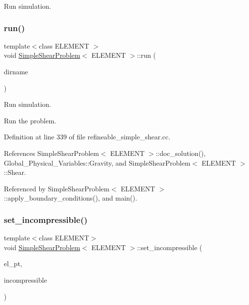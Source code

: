 Run simulation. 

\mbox{\label{classSimpleShearProblem_ac1746a2634e310571d40d70719d509c0}} 
\subsubsection{\texorpdfstring{run()}{run()}\hspace{0.1cm}{\footnotesize\ttfamily [2/2]}}
{\footnotesize\ttfamily template$<$class E\+L\+E\+M\+E\+NT $>$ \\
void \hyperlink{classSimpleShearProblem}{Simple\+Shear\+Problem}$<$ E\+L\+E\+M\+E\+NT $>$\+::run (\begin{DoxyParamCaption}\item[{const std\+::string \&}]{dirname }\end{DoxyParamCaption})}



Run simulation. 

Run the problem. 

Definition at line 339 of file refineable\+\_\+simple\+\_\+shear.\+cc.



References Simple\+Shear\+Problem$<$ E\+L\+E\+M\+E\+N\+T $>$\+::doc\+\_\+solution(), Global\+\_\+\+Physical\+\_\+\+Variables\+::\+Gravity, and Simple\+Shear\+Problem$<$ E\+L\+E\+M\+E\+N\+T $>$\+::\+Shear.



Referenced by Simple\+Shear\+Problem$<$ E\+L\+E\+M\+E\+N\+T $>$\+::apply\+\_\+boundary\+\_\+conditions(), and main().

\mbox{\label{classSimpleShearProblem_a3e5d5f57fc041531ee683f50395536f0}} 
\subsubsection{\texorpdfstring{set\+\_\+incompressible()}{set\_incompressible()}\hspace{0.1cm}{\footnotesize\ttfamily [1/7]}}
{\footnotesize\ttfamily template$<$class E\+L\+E\+M\+E\+NT$>$ \\
void \hyperlink{classSimpleShearProblem}{Simple\+Shear\+Problem}$<$ E\+L\+E\+M\+E\+NT $>$\+::set\+\_\+incompressible (\begin{DoxyParamCaption}\item[{E\+L\+E\+M\+E\+NT $\ast$}]{el\+\_\+pt,  }\item[{const bool \&}]{incompressible }\end{DoxyParamCaption})\hspace{0.3cm}{\ttfamily [private]}}


